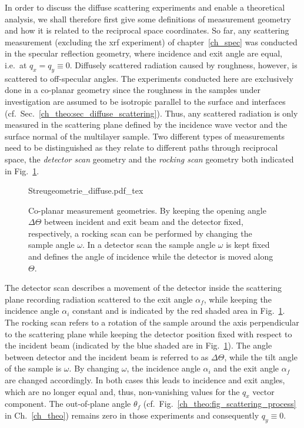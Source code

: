 In order to discuss the diffuse scattering experiments and enable a theoretical analysis, we shall therefore first give some definitions of measurement geometry and how it is related to the reciprocal space coordinates. So far, any scattering measurement (excluding the \gls{xrf} experiment) of chapter~\ref{ch_spec} was conducted in the specular reflection geometry, where incidence and exit angle are equal, i.e.~at $q_x = q_y \equiv 0$. Diffusely scattered radiation caused by roughness, however, is scattered to off-specular angles. The experiments conducted here are exclusively done in a co-planar geometry since the roughness in the samples under investigation are assumed to be isotropic parallel to the surface and interfaces (cf.~Sec.~\ref{ch_theo:sec_diffuse_scattering}). Thus, any scattered radiation is only measured in the scattering plane defined by the incidence wave vector and the surface normal of the multilayer sample. Two different types of measurements need to be distinguished as they relate to different paths through reciprocal space, the \emph{detector scan} geometry and the \emph{rocking scan} geometry both indicated in Fig.~\ref{ch_diff:fig_scattering_geometry}.
\begin{figure}[htb]
    \def\svgwidth{0.6\textwidth}
    {Streugeometrie_diffuse.pdf_tex}
    \caption{Co-planar measurement geometries. By keeping the opening angle $\Delta\Theta$ between incident and exit beam and the detector fixed, respectively, a rocking scan can be performed by changing the sample angle $\omega$. In a detector scan the sample angle $\omega$ is kept fixed and defines the angle of incidence while the detector is moved along $\Theta$.}
    \label{ch_diff:fig_scattering_geometry}
\end{figure}
The detector scan describes a movement of the detector inside the scattering plane recording radiation scattered to the exit angle $\alpha_f$, while keeping the incidence angle $\alpha_i$ constant and is indicated by the red shaded area in Fig.~\ref{ch_diff:fig_scattering_geometry}. The rocking scan refers to a rotation of the sample around the axis perpendicular to the scattering plane while keeping the detector position fixed with respect to the incident beam (indicated by the blue shaded are in Fig.~\ref{ch_diff:fig_scattering_geometry}). The angle between detector and the incident beam is referred to as $\Delta \Theta$, while the tilt angle of the sample is $\omega$. By changing $\omega$, the incidence angle $\alpha_i$ and the exit angle $\alpha_f$ are changed accordingly. In both cases this leads to incidence and exit angles, which are no longer equal and, thus, non-vanishing values for the $q_x$ vector component. The out-of-plane angle $\theta_f$ (cf.~Fig.~\ref{ch_theo:fig_scattering_process} in Ch.~\ref{ch_theo}) remains zero in those experiments and consequently $q_y \equiv 0$.

